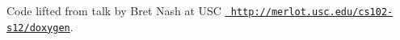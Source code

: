 Code lifted from talk by Bret Nash at U\+SC \href{http://merlot.usc.edu/cs102-s12/doxygen}{\texttt{ http\+://merlot.\+usc.\+edu/cs102-\/s12/doxygen}}. 